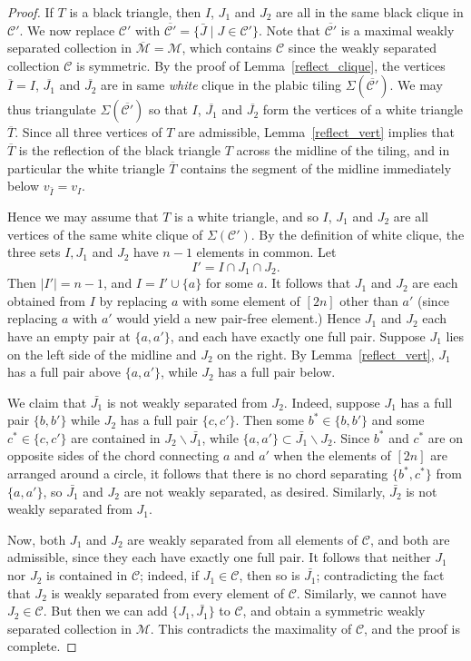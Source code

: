 \documentclass[10pt]{amsart}
\theoremstyle{definition}
\begin{document}
\begin{proof}
If $T$ is a black triangle, then $I$, $J_1$ and $J_2$ are all in the same black clique in $\mathcal{C}'$. We now replace $\mathcal{C}'$ with $\overline{\mathcal{C}'} = \{\bar{J} \mid J \in \mathcal{C}'\}$. Note that $\overline{\mathcal{C}'}$ is a maximal weakly separated collection in $\overline{\mathcal{M}} = \mathcal{M}$, which contains $\mathcal{C}$ since the weakly separated collection $\mathcal{C}$ is symmetric. By the proof of Lemma~\ref{reflect_clique}, the vertices $\overline{I}=I$, $\overline{J_1}$ and $\overline{J_2}$ are in same \emph{white} clique in the plabic tiling $\Sigma(\overline{\mathcal{C}'})$. We may thus triangulate $\Sigma(\overline{\mathcal{C}'})$ so that $I$, $\overline{J_1}$ and $\overline{J_2}$ form the vertices of a white triangle $\overline{T}$. Since all three vertices of $T$ are admissible, Lemma~\ref{reflect_vert} implies that $\overline{T}$ is the reflection of the black triangle $T$ across the midline of the tiling, and in particular the white triangle $\overline{T}$ contains the segment of the midline immediately below $v_{\bar{I}} = v_{I}$. 

Hence we may assume that $T$ is a white triangle, and so $I$, $J_1$ and $J_2$ are all vertices of the same white clique of $\Sigma(\mathcal{C}')$. By the definition of white clique, the three sets $I,J_1$ and $J_2$ have $n-1$ elements in common. Let
\[I' = I \cap J_1 \cap J_2.\]
Then $|I'| = n-1$, and $I = I' \cup \{a\}$ for some $a$. 
It follows that $J_1$ and $J_2$ are each obtained from $I$ by replacing $a$ with some element of $[2n]$ other than $a'$ (since replacing $a$ with $a'$ would yield a new pair-free element.) Hence $J_1$ and $J_2$ each have an empty pair at $\{a,a'\}$, and each have exactly one full pair. Suppose $J_1$ lies on the left side of the midline and $J_2$ on the right. By Lemma~\ref{reflect_vert}, $J_1$ has a full pair above $\{a,a'\}$, while $J_2$ has a full pair below. 

We claim that $\bar{J_1}$ is not weakly separated from $J_2$. Indeed, suppose $J_1$ has a full pair $\{b,b'\}$ while $J_2$ has a full pair $\{c, c'\}$. Then some $b^* \in \{b, b'\}$ and some $c^* \in \{c,c'\}$ are contained in $J_2 \backslash \bar{J_1}$, while $\{a,a'\} \subset \bar{J_1} \backslash J_2$. 
Since $b^*$ and $c^*$ are on opposite sides of the chord connecting $a$ and $a'$ when the elements of $[2n]$ are arranged around a circle, it follows that there is no chord separating $\{b^*, c^*\}$ from $\{a,a'\}$, so
$\bar{J_1}$ and $J_2$ are not weakly separated, as desired. 
Similarly, $\bar{J_2}$ is not weakly separated from $J_1$.

Now, both $J_1$ and $J_2$ are weakly separated from all elements of $\mathcal{C}$, and both are admissible, since they each have exactly one full pair. It follows that neither $J_1$ nor $J_2$ is contained in $\mathcal{C}$; indeed, if $J_1 \in \mathcal{C}$, then so is $\bar{J_1}$; contradicting the fact that $J_2$ is weakly separated from every element of $\mathcal{C}$. Similarly, we cannot have $J_2 \in \mathcal{C}$. But then we can add $\{J_1, \bar{J_1}\}$ to $\mathcal{C}$, and obtain a symmetric weakly separated collection in $\mathcal{M}$. This contradicts the maximality of $\mathcal{C}$, and the proof is complete.\end{proof}
\end{document}
